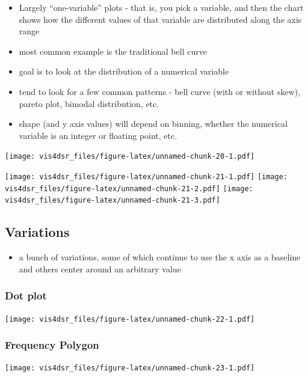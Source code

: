 \documentclass[
]{krantz}
\providecommand{\tightlist}{%
  \setlength{\itemsep}{0pt}\setlength{\parskip}{0pt}}
\begin{document}
\begin{itemize}
\tightlist
\item
  Largely ``one-variable'' plots - that is, you pick a variable, and then the chart
  shows how the different values of that variable are distributed along the axis range
\item
  most common example is the traditional bell curve
\item
  goal is to look at the distribution of a numerical variable
\item
  tend to look for a few common patterns - bell curve (with or without skew),
  pareto plot, bimodal distribution, etc.
\item
  shape (and y axis values) will depend on binning, whether the numerical variable is an integer or
  floating point, etc.
\end{itemize}

\texttt{[image: vis4dsr\_files/figure-latex/unnamed-chunk-20-1.pdf]}

\texttt{[image: vis4dsr\_files/figure-latex/unnamed-chunk-21-1.pdf]} \texttt{[image: vis4dsr\_files/figure-latex/unnamed-chunk-21-2.pdf]} \texttt{[image: vis4dsr\_files/figure-latex/unnamed-chunk-21-3.pdf]}

\hypertarget{variations-5}{%
\subsection{Variations}\label{variations-5}}

\begin{itemize}
\tightlist
\item
  a bunch of variations, some of which continue to use the x axis as a baseline and
  others center around an arbitrary value
\end{itemize}

\hypertarget{dot-plot}{%
\subsubsection{Dot plot}\label{dot-plot}}

\texttt{[image: vis4dsr\_files/figure-latex/unnamed-chunk-22-1.pdf]}

\hypertarget{frequency-polygon}{%
\subsubsection{Frequency Polygon}\label{frequency-polygon}}

\texttt{[image: vis4dsr\_files/figure-latex/unnamed-chunk-23-1.pdf]}
\end{document}
